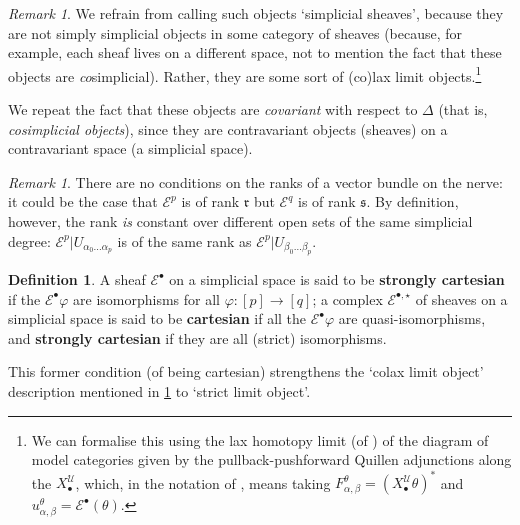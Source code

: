 \documentclass[11pt,fleqn]{article}
\theoremstyle{plain}
\theoremstyle{definition}
\newtheorem{definition}[theorem]{Definition}
\theoremstyle{remark}
\newtheorem{remark}[theorem]{Remark}
\numberwithin{equation}{theorem}
\newcommand{\cover}{\mathcal{U}}
\newcommand{\anotherbullet}{\star}
\newcommand{\restricted}{\mathbin{\big\vert}}
\newcommand{\define}[1]{\textbf{#1}}
\newcommand{\nerve}[1]{X_{#1}^\cover}
\begin{document}
        \begin{remark}\label{remark:simplicial-sheaves-terminology}
            We refrain from calling such objects `simplicial sheaves', because they are not simply simplicial objects in some category of sheaves (because, for example, each sheaf lives on a different space, not to mention the fact that these objects are \emph{co}simplicial).
            Rather, they are some sort of (co)lax limit objects.\footnote{We can formalise this using the lax homotopy limit (of \cite[Definition~3.1]{Bergner2012}) of the diagram of model categories given by the pullback-pushforward Quillen adjunctions along the $\nerve{\bullet}$, which, in the notation of \cite{Bergner2012}, means taking $F_{\alpha,\beta}^\theta = (\nerve{\bullet}\theta)^*$ and $u_{\alpha,\beta}^\theta = \mathcal{E}^\bullet(\theta)$.}

            We repeat the fact that these objects are \emph{covariant} with respect to $\Delta$ (that is, \emph{cosimplicial objects}), since they are contravariant objects (sheaves) on a contravariant space (a simplicial space).
        \end{remark}

        \begin{remark}\label{remark:rank-of-vector-bundle-on-the-nerve}
            There are no conditions on the ranks of a vector bundle on the nerve: it could be the case that $\mathcal{E}^p$ is of rank $\mathfrak{r}$ but $\mathcal{E}^q$ is of rank $\mathfrak{s}$.
            By definition, however, the rank \emph{is} constant over different open sets of the same simplicial degree: $\mathcal{E}^p\restricted U_{\alpha_0\ldots\alpha_p}$ is of the same rank as $\mathcal{E}^p\restricted U_{\beta_0\ldots\beta_p}$.
        \end{remark}

        \begin{definition}
            A sheaf $\mathcal{E}^\bullet$ on a simplicial space is said to be \define{strongly cartesian} if the $\mathcal{E}^\bullet\varphi$ are isomorphisms for all $\varphi\colon[p]\to[q]$; a complex $\mathcal{E}^{\bullet,\anotherbullet}$ of sheaves on a simplicial space is said to be \define{cartesian} if all the $\mathcal{E}^\bullet\varphi$ are quasi-isomorphisms, and \define{strongly cartesian} if they are all (strict) isomorphisms.

            This former condition (of being cartesian) strengthens the `colax limit object' description mentioned in \cref{remark:simplicial-sheaves-terminology} to `strict limit object'.
        \end{definition}
\end{document}

